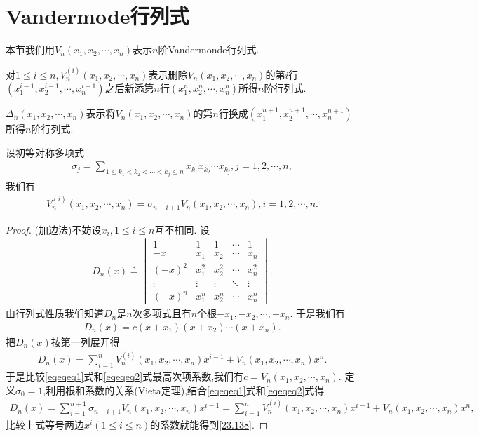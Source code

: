 \documentclass[../../main.tex]{subfiles}
\begin{document}
\section{Vandermode行列式}

本节我们用\(V_n(x_1,x_2,\cdots,x_n)\)表示\(n\)阶Vandermonde行列式.
\begin{definition}
对\(1\leqslant i\leqslant n,V_n^{(i)}(x_1,x_2,\cdots,x_n)\)表示删除\(V_n(x_1,x_2,\cdots,x_n)\)的第\(i\)行\((x_1^{i - 1},x_2^{i - 1},\cdots,x_n^{i - 1})\)之后新添第\(n\)行\((x_1^{n},x_2^{n},\cdots,x_n^{n})\)所得\(n\)阶行列式.
\end{definition}

\begin{definition}
\(\Delta_n(x_1,x_2,\cdots,x_n)\)表示将\(V_n(x_1,x_2,\cdots,x_n)\)的第\(n\)行换成\((x_1^{n + 1},x_2^{n + 1},\cdots,x_n^{n + 1})\)所得\(n\)阶行列式.
\end{definition}


\begin{example}
设初等对称多项式
\begin{align}\label{23.137}
\sigma_j=\sum_{1\leqslant k_1<k_2<\cdots<k_j\leqslant n}x_{k_1}x_{k_2}\cdots x_{k_j},j = 1,2,\cdots,n,
\end{align}
我们有
\begin{align}
V_n^{(i)}(x_1,x_2,\cdots,x_n)=\sigma_{n - i + 1}V_n(x_1,x_2,\cdots,x_n),i = 1,2,\cdots,n.\label{23.138}
\end{align}
\end{example}
\begin{proof}
(加边法)不妨设\(x_i,1\leqslant i\leqslant n\)互不相同. 设
\begin{align*}
D_n(x)\triangleq\begin{vmatrix}
1&1&1&\cdots&1\\
-x&x_1&x_2&\cdots&x_n\\
(-x)^2&x_1^2&x_2^2&\cdots&x_n^2\\
\vdots&\vdots&\vdots&\ddots&\vdots\\
(-x)^n&x_1^n&x_2^n&\cdots&x_n^n
\end{vmatrix}.
\end{align*}
由行列式性质我们知道\(D_n\)是\(n\)次多项式且有\(n\)个根\(-x_1,-x_2,\cdots,-x_n\). 于是我们有
\begin{align}\label{eqeqeq1}
D_n(x)=c(x + x_1)(x + x_2)\cdots(x + x_n).
\end{align}
把\(D_n(x)\)按第一列展开得
\begin{align}\label{eqeqeq2}
D_n(x)=\sum_{i = 1}^{n}V_n^{(i)}(x_1,x_2,\cdots,x_n)x^{i - 1}+V_n(x_1,x_2,\cdots,x_n)x^n.
\end{align}
于是比较\eqref{eqeqeq1}式和\eqref{eqeqeq2}式最高次项系数,我们有\(c = V_n(x_1,x_2,\cdots,x_n)\). 定义\(\sigma_0 = 1\),利用根和系数的关系(Vieta定理),结合\eqref{eqeqeq1}式和\eqref{eqeqeq2}式得
\begin{align*}
D_n(x)=\sum_{i = 1}^{n + 1}\sigma_{n - i + 1}V_n(x_1,x_2,\cdots,x_n)x^{i - 1}=\sum_{i = 1}^{n}V_n^{(i)}(x_1,x_2,\cdots,x_n)x^{i - 1}+V_n(x_1,x_2,\cdots,x_n)x^n,
\end{align*}
比较上式等号两边$x^i(1\leq i\leq n)$的系数就能得到\eqref{23.138}. 
\end{proof}
\end{document}
